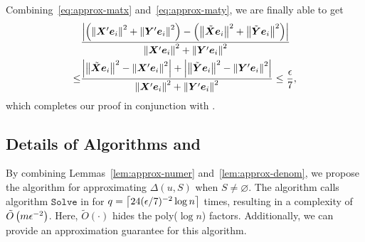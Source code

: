 \documentclass[10pt,twocolumn,twoside]{IEEEtran}
\begin{document}
\begin{IEEEproof}
\begin{equation}
    \end{equation}
    Combining~\eqref{eq:approx-matx} and~\eqref{eq:approx-maty}, we are finally able to get
    \begin{align*}
            & \frac{\left|\left( \left\Vert\boldsymbol{X}'\boldsymbol{e}_i\right\Vert^2+\left\Vert\boldsymbol{Y}'\boldsymbol{e}_i\right\Vert^2 \right)-\left( \left\Vert\tilde{\boldsymbol{X}}\boldsymbol{e}_i\right\Vert^2+\left\Vert\tilde{\boldsymbol{Y}}\boldsymbol{e}_i\right\Vert^2 \right) \right|}{\left\Vert\boldsymbol{X}'\boldsymbol{e}_i\right\Vert^2+\left\Vert\boldsymbol{Y}'\boldsymbol{e}_i\right\Vert^2}             \\
        \le & \frac{\left|\left\Vert\tilde{\boldsymbol{X}}\boldsymbol{e}_i\right\Vert^2-\left\Vert\boldsymbol{X}'\boldsymbol{e}_i\right\Vert^2 \right|+\left|\left\Vert\tilde{\boldsymbol{Y}}\boldsymbol{e}_i\right\Vert^2-\left\Vert\boldsymbol{Y}'\boldsymbol{e}_i\right\Vert^2 \right|}{\left\Vert\boldsymbol{X}'\boldsymbol{e}_i\right\Vert^2+\left\Vert\boldsymbol{Y}'\boldsymbol{e}_i\right\Vert^2}\le\frac{\epsilon}{7},
    \end{align*}
    which completes our proof in conjunction with .
\end{IEEEproof}

\subsection{Details of Algorithms  and }

By combining Lemmas~\ref{lem:approx-numer} and~\ref{lem:approx-denom}, we propose the  algorithm for approximating \(\Delta(u,S)\) when \(S\neq\varnothing\).
The  algorithm calls algorithm \(\mathtt{Solve}\) in  for \(q=\left\lceil24(\epsilon/7)^{-2}\log n\right\rceil\) times, resulting in a complexity of \(\tilde{O}\left( m\epsilon^{-2} \right)\).
Here, \(\tilde{O}(\cdot)\) hides the poly(\(\log n\)) factors.
Additionally, we can provide an approximation guarantee for this algorithm.
\end{document}
